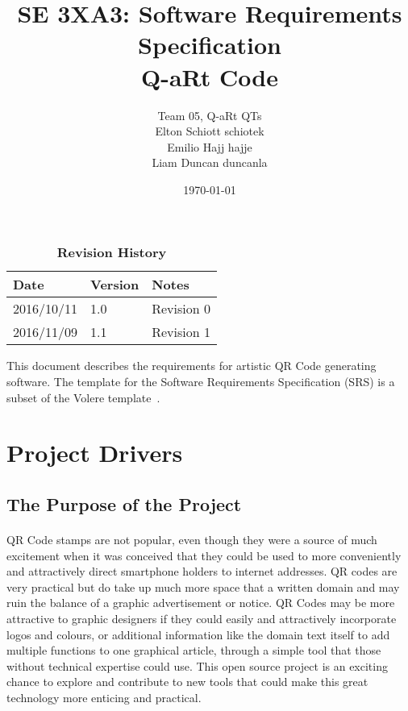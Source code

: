\documentclass[12pt, titlepage]{article}
\title{SE 3XA3: Software Requirements Specification\\Q-aRt Code}
\author{Team 05, Q-aRt QTs
		\\ Elton Schiott schiotek
		\\ Emilio Hajj hajje
		\\ Liam Duncan duncanla
}
\date{\today}
\begin{document}
\maketitle

\tableofcontents
\listoftables
\listoffigures

\begin{table}[bp]
\caption{\bf Revision History}
\begin{tabularx}{\textwidth}{p{3cm}p{2cm}X}
\toprule {\bf Date} & {\bf Version} & {\bf Notes}\\
\midrule
2016/10/11 & 1.0 & Revision 0\\
2016/11/09 & 1.1 & Revision 1\\
\bottomrule
\end{tabularx}
\end{table}

\newpage


This document describes the requirements for artistic QR Code generating 
software.  The template for the Software
Requirements Specification (SRS) is a subset of the Volere
template~\citep{RobertsonAndRobertson2012}.  

\section{Project Drivers}

\subsection{The Purpose of the Project}

	\paragraph{}
		
		QR Code stamps are not popular, even though they were a source of much 
		excitement when it was conceived that they could be used to more 
		conveniently and attractively direct smartphone holders to internet 
		addresses. QR codes are very practical but do take up much more space 
		that a written domain and may ruin the balance of a graphic 
		advertisement or notice. QR Codes may be more attractive to graphic 
		designers if they could easily and attractively incorporate logos and 
		colours, or additional information like the domain text itself to add 
		multiple functions to one graphical article, through a simple tool that 
		those without technical expertise could use. This open source project 
		is an exciting chance to explore and contribute to new tools that could 
		make this great technology more enticing and practical.
\end{document}

